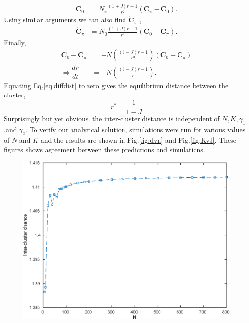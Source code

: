 \documentclass[superscriptaddress,reprint,amssymb, amsmath,aps, pre]{revtex4-1}
\begin{document}
{{\begin{align}
            \dot{\mathbf{C}}_0 &= N_\pi \frac{(1+J) r - 1}{r^2} (\mathbf{C}_\pi - \mathbf{C}_0). 
        \end{align}
        Using similar arguments we can also find \(\dot{\mathbf{C}}_\pi\) ,
        \begin{align}
            \dot{\mathbf{C}}_\pi &= N_0 \frac{(1+J) r - 1}{r^2} (\mathbf{C}_0 - \mathbf{C}_\pi).
        \end{align}
        Finally,
        \begin{align}
            \dot{\mathbf{C}}_0 - \dot{\mathbf{C}}_\pi &= -N \left(\frac{(1-J)r -1}{r^2}\right)(\mathbf{C}_0 - \mathbf{C}_\pi) \nonumber \\
            \Rightarrow \dfrac{dr}{dt} &= -N \left(\frac{(1-J)r -1}{r}\right). \label{eq:diffdist}
        \end{align}
        Equating Eq.\ref*{eq:diffdist} to zero gives the equilibrium distance between the cluster,
        \begin{equation}\label{eq:eqdist}
            r^* = \frac{1}{1-J}
        \end{equation} %
        Surprisingly but yet obvious, the inter-cluster distance is independent of \(N,K,\gamma_1\),and \(\gamma_2\). To verify our analytical solution, simulations were run for various values of \(N\) and \(K\) and the results are shown in Fig.\ref{fig:dvn} and Fig.\ref{fig:KvJ}. These figures shows agreement between these predictions and simulations. 
        \begin{figure}[h!]
            \includegraphics[width = \linewidth]{dvn.eps}

\end{figure}}}
\end{document}
